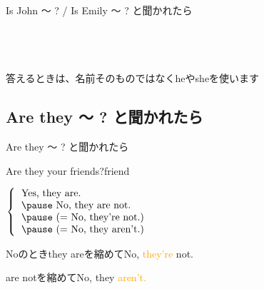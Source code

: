 \documentclass[aspectratio=169]{beamer}
\newcommand{\myaudio}[1]{\href{#1}{\faVolumeUp}}
\begin{document}
\begin{frame}[plain]{Is John  〜 ? / Is Emily 〜 ? と聞かれたら}
\begin{columns}[t]
\begin{column}{.49\textwidth}
\pause

\vspace{20pt}

\mbox{}\hfill\myaudio{./audio/009_answer_be_03.mp3}\,\,{}
\end{column}
\end{columns}

\pause

{\small 答えるときは、名前そのものではなくheやsheを使います}
\end{frame}

 \subsection{Are they 〜 ? と聞かれたら}
\begin{frame}[plain]{Are they 〜 ? と聞かれたら}
 \Large


\pause

Are they your friends?\hfill{\scriptsize friend }

\pause

\vspace{10pt}

\mbox{}\hspace{100pt}$\left\{\begin{tabular}{l}
         Yes, they are.\\\pause
         No, they are not.\\\pause
         \text{(}= \text{No, they're not.)}\\\pause
         \text{(}= \text{No, they aren't.)}
        \end{tabular}\right.$
\vspace{10pt}

\pause 
\mbox{}\hfill{}{\small Noのときthey areを縮めてNo, \textcolor{orange}{they're} not.}

\vspace{-8pt}

\mbox{}\hfill{}{\small \phantom{Noのとき}are notを縮めてNo, they \textcolor{orange}{aren't.}}

\vspace{20pt}

\mbox{}\hfill\myaudio{./audio/009_answer_be_04.mp3}\,\,{}
\end{frame}
\end{document}
